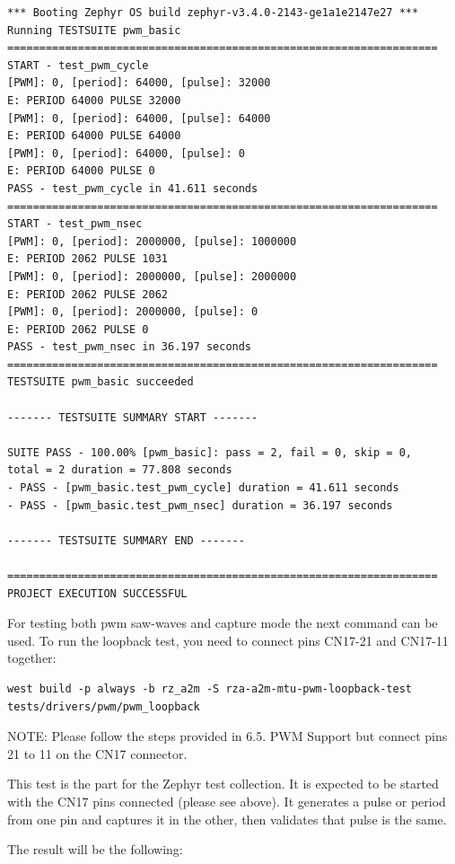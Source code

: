 \documentclass[11pt,a4paper,oneside]{article}
\begin{document}
\begin{lstlisting}
*** Booting Zephyr OS build zephyr-v3.4.0-2143-ge1a1e2147e27 ***
Running TESTSUITE pwm_basic
===================================================================
START - test_pwm_cycle
[PWM]: 0, [period]: 64000, [pulse]: 32000
E: PERIOD 64000 PULSE 32000
[PWM]: 0, [period]: 64000, [pulse]: 64000
E: PERIOD 64000 PULSE 64000
[PWM]: 0, [period]: 64000, [pulse]: 0
E: PERIOD 64000 PULSE 0
PASS - test_pwm_cycle in 41.611 seconds
===================================================================
START - test_pwm_nsec
[PWM]: 0, [period]: 2000000, [pulse]: 1000000
E: PERIOD 2062 PULSE 1031
[PWM]: 0, [period]: 2000000, [pulse]: 2000000
E: PERIOD 2062 PULSE 2062
[PWM]: 0, [period]: 2000000, [pulse]: 0
E: PERIOD 2062 PULSE 0
PASS - test_pwm_nsec in 36.197 seconds
===================================================================
TESTSUITE pwm_basic succeeded

------- TESTSUITE SUMMARY START -------

SUITE PASS - 100.00% [pwm_basic]: pass = 2, fail = 0, skip = 0,
total = 2 duration = 77.808 seconds
- PASS - [pwm_basic.test_pwm_cycle] duration = 41.611 seconds
- PASS - [pwm_basic.test_pwm_nsec] duration = 36.197 seconds

------- TESTSUITE SUMMARY END -------

===================================================================
PROJECT EXECUTION SUCCESSFUL
\end{lstlisting}

For testing both pwm saw-waves and capture mode the next command can be
used. To run the loopback test, you need to connect pins CN17-21 and
CN17-11 together:

\begin{lstlisting}
west build -p always -b rz_a2m -S rza-a2m-mtu-pwm-loopback-test
tests/drivers/pwm/pwm_loopback
\end{lstlisting}

NOTE: Please follow the steps provided in 6.5. PWM Support but connect
pins 21 to 11 on the CN17 connector.

This test is the part for the Zephyr test collection. It is expected to
be started with the CN17 pins connected (please see above). It generates
a pulse or period from one pin and captures it in the other, then
validates that pulse is the same.

The result will be the following:
\end{document}
